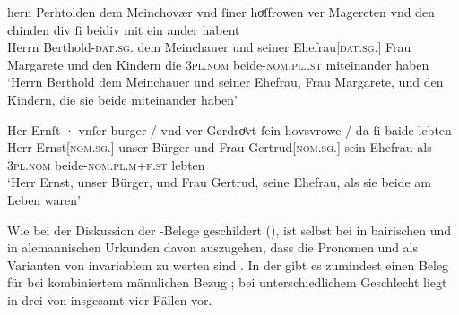 \begin{exe}
\ex \label{ex:m+f_si_beide_iu}
	\begin{xlist}
	\ex \label{ex:m+f_si_beidiu}
		\gll hern Perhtolden dem Meinchovær vnd ſiner hoͮſfrowen ver Magereten
				vnd den chinden div ſi beidiv {mit ein ander} habent \\
			Herrn Berthold-\textsc{dat.sg.\MascM} dem Meinchauer und seiner
				Ehefrau[\textsc{dat.sg.\FemF}] Frau Margarete und den Kindern
				die \textsc{3pl\subMF.nom} beide-\textsc{nom.pl.\NeutMF.st}
				miteinander haben \\
		\trans `Herrn Berthold dem Meinchauer und seiner Ehefrau, Frau
			Margarete, und den Kindern, die sie beide miteinander haben'
			\parencites(Nr.~937, Regensburg, 1287)[292,40--41]{cao2}

	\ex \label{ex:m+f_si_beide}
		\gll Her Ernſt · vnſer burger / vnd ver Gerdroͤvt ſein hovsvrowe / da
				ſi baide lebten \\
			Herr Ernst[\textsc{nom.sg.\MascM}] {} unser Bürger {} und Frau
				Gertrud[\textsc{nom.sg.\FemF}] sein Ehefrau {} als
				\textsc{3pl\subMF.nom} beide-\textsc{nom.pl.m+f\subMF.st}
				lebten \\
		\trans `Herr Ernst, unser Bürger, und Frau Gertrud, seine Ehefrau,
			als sie beide am Leben waren'
			\parencites(Nr.~1073, Wien, 1289)[374,40--41]{cao2}
	\end{xlist}
\end{exe}

Wie bei der Diskussion der \CAO{}-Belege geschildert
(), ist selbst bei
 in bairischen und  in
alemannischen Urkunden davon auszugehen, dass die
Pronomen  und  als Varianten von invariablem  zu
werten sind \autocite[vgl.][394--396]{ksw2}. In der \KC{} gibt es zumindest
einen Beleg für  bei kombiniertem männlichen Bezug
; bei unterschiedlichem Geschlecht liegt
 in drei von insgesamt vier Fällen vor.

